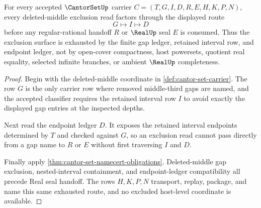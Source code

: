 \begin{theorem}
\label{thm:cantor-set-deleted-gap-ledger-exhaustion}
For every accepted $\CantorSetUp$ carrier $C=(T,G,I,D,R,E,H,K,P,N)$, every deleted-middle exclusion read factors through the displayed route
$$
G\longmapsto I\longmapsto D
$$
before any regular-rational handoff $R$ or $\RealUp$ seal $E$ is consumed. Thus the exclusion surface is exhausted by the finite gap ledger, retained interval row, and endpoint ledger, not by open-cover compactness, host powersets, quotient real equality, selected infinite branches, or ambient $\RealUp$ completeness.
\end{theorem}
\begin{proof}
Begin with the deleted-middle coordinate in \autoref{def:cantor-set-carrier}. The row $G$ is the only carrier row where removed middle-third gaps are named, and the accepted classifier requires the retained interval row $I$ to avoid exactly the displayed gap entries at the inspected depths.

Next read the endpoint ledger $D$. It exposes the retained interval endpoints determined by $T$ and checked against $G$, so an exclusion read cannot pass directly from a gap name to $R$ or $E$ without first traversing $I$ and $D$.

Finally apply \autoref{thm:cantor-set-namecert-obligations}. Deleted-middle gap exclusion, nested-interval containment, and endpoint-ledger compatibility all precede Real seal handoff. The rows $H,K,P,N$ transport, replay, package, and name this same exhausted route, and no excluded host-level coordinate is available.
\end{proof}

